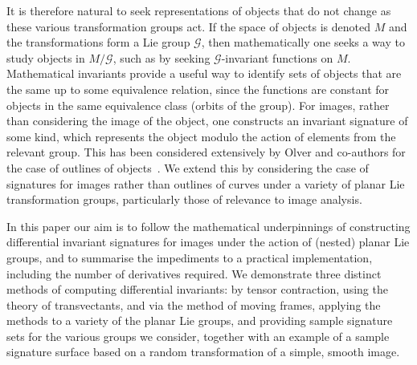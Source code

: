 \documentclass{artjlt}
\begin{document}
It is therefore natural to seek representations of objects that do not change as these various transformation groups act. If the space of objects is denoted $M$ and the transformations form a Lie group $\mathcal{G}$, then mathematically one seeks a way to study objects in $M / \mathcal{G}$, such as by seeking $\mathcal{G}$-invariant functions on $M$. Mathematical invariants provide a useful way to identify sets of objects that are the same up to some equivalence relation, since the functions are constant for objects in the same equivalence class (orbits of the group). For images, rather than considering the image of the object, one constructs an invariant signature of some kind, which represents the object modulo the action of elements from the relevant group. This has been considered extensively by Olver and co-authors for the case of outlines of objects~\citep{Calabi1998,Hoff2013}. We extend this by considering the case of signatures for images rather than outlines of curves under a variety of planar Lie transformation groups, particularly those of relevance to image analysis.

In this paper our aim is to follow the mathematical underpinnings of constructing differential invariant signatures for images under the action of (nested) planar Lie groups, and to summarise the impediments to a practical implementation, including the number of derivatives required. We demonstrate three distinct methods of computing differential invariants: by tensor contraction, using the theory of transvectants, and via the method of moving frames, applying the methods to a variety of the planar Lie groups, and providing sample signature sets for the various groups we consider, together with an example of a sample signature surface based on a random transformation of a simple, smooth image.

\end{document}
